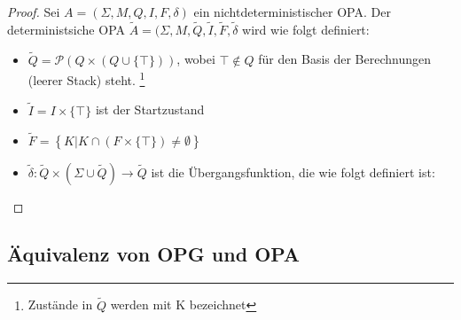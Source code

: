 \begin{proof}
Sei $A=(\Sigma, M, Q, I, F, \delta)$ ein nichtdeterministischer OPA. Der deterministsiche OPA $\tilde{A}=(\Sigma, M, \tilde{Q}, \tilde{I}, \tilde{F}, \tilde{\delta}$ wird wie folgt definiert:
\begin{itemize}
\item
$\tilde{Q} = \mathcal{P}(Q \times (Q \cup \{\top\}))$, wobei $\top \notin Q$ für den Basis der Berechnungen (leerer Stack) steht. \footnote{Zustände in $\tilde{Q}$ werden mit K bezeichnet}
\item
$\tilde{I}=I\times \{\top \}$ ist der Startzustand
\item
$\tilde{F}=\left\{K|K \cap (F \times \{\top\}) \neq \emptyset\right\}$
\item
$\tilde{\delta}: \tilde{Q} \times (\Sigma \cup \tilde{Q})\rightarrow \tilde{Q}$ ist die Übergangsfunktion, die wie folgt definiert ist: 
\end{itemize} 
\end{proof}
\subsection{Äquivalenz von OPG und OPA}
